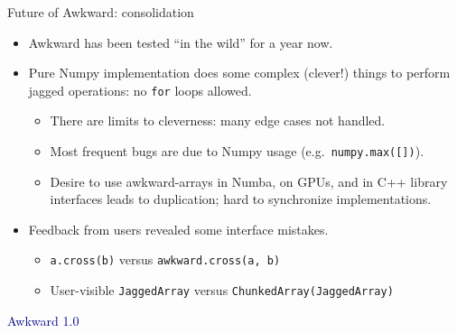 \documentclass[aspectratio=169]{beamer}
\begin{document}
\begin{frame}{Future of Awkward: consolidation}
\Large
\vspace{0.35 cm}
\begin{itemize}\setlength{\itemsep}{0.25 cm}
\item<1-> Awkward has been tested ``in the wild'' for a year now.
\item<2-> Pure Numpy implementation does some complex (clever!) things to perform jagged operations: no \texttt{for} loops allowed.

\vspace{0.1 cm}
\begin{itemize}\setlength{\itemsep}{0.2 cm}
\item<3-> \large There are limits to cleverness: many edge cases not handled.
\item<4-> \large Most frequent bugs are due to Numpy usage (e.g.\ \texttt{numpy.max([])}).
\item<5-> \large Desire to use awkward-arrays in Numba, on GPUs, and in C++ library interfaces leads to duplication; hard to synchronize implementations.
\end{itemize}

\item<6-> Feedback from users revealed some interface mistakes.

\vspace{0.1 cm}
\begin{itemize}\setlength{\itemsep}{0.2 cm}
\item<7-> \large \texttt{a.cross(b)} versus \texttt{awkward.cross(a, b)}
\item<8-> \large User-visible \texttt{JaggedArray} versus \texttt{ChunkedArray(JaggedArray)}
\end{itemize}
\end{itemize}
\end{frame}

\begin{frame}{}
\huge
\vspace{1 cm}
\begin{center}
\textcolor{darkblue}{Awkward 1.0}
\end{center}
\end{frame}
\end{document}
